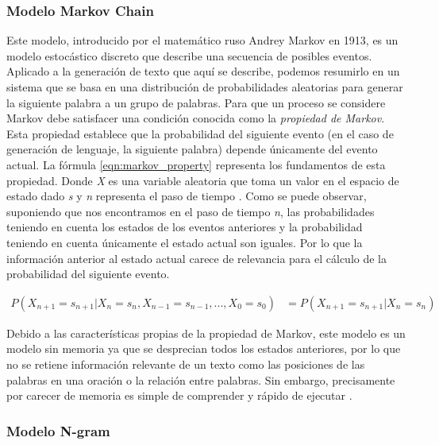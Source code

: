 \subsubsection{Modelo Markov Chain}

Este modelo, introducido por el matemático ruso Andrey Markov en 1913, es un modelo estocástico discreto que describe una secuencia de posibles eventos. Aplicado a la generación de texto que aquí se describe, podemos resumirlo en un sistema que se basa en una distribución de probabilidades aleatorias para generar la siguiente palabra a un grupo de palabras. Para que un proceso se considere Markov debe satisfacer una condición conocida como la \textit{propiedad de Markov}. Esta propiedad establece que la probabilidad del siguiente evento (en el caso de generación de lenguaje, la siguiente palabra) depende únicamente del evento actual. La fórmula \ref{eqn:markov_property} representa los fundamentos de esta propiedad. Donde \textit{X} es una variable aleatoria que toma un valor en el espacio de estado dado \textit{s} y \textit{n} representa el paso de tiempo \citep{howell_2022}. Como se puede observar, suponiendo que nos encontramos en el paso de tiempo \textit{n}, las probabilidades teniendo en cuenta los estados de los eventos anteriores y la probabilidad teniendo en cuenta únicamente el estado actual son iguales. Por lo que la información anterior al estado actual carece de relevancia para el cálculo de la probabilidad del siguiente evento.

\begin{equation}
	\label{eqn:markov_property}
	\begin{aligned}
		P(X_{n+1} = s_{n+1}|X_{n} = s_{n}, X_{n-1} = s_{n-1}, ..., X_{0} = s_{0}) &= P(X_{n+1} = s_{n+1}|X_{n} = s_{n})
	\end{aligned}
\end{equation}


Debido a las características propias de la propiedad de Markov, este modelo es un modelo sin memoria ya que se desprecian todos los estados anteriores, por lo que no se retiene información relevante de un texto como las posiciones de las palabras en una oración o la relación entre palabras. Sin embargo, precisamente por carecer de memoria es simple de comprender y rápido de ejecutar \citep{fumagalli_2020}.


\subsubsection{Modelo N-gram}


